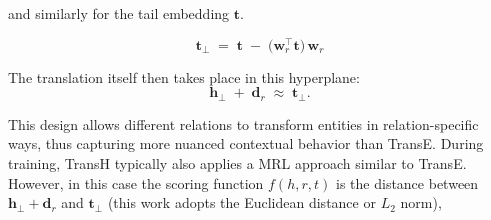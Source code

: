 \begin{enumerate}
and similarly for the tail embedding \(\mathbf{t}\).

\begin{equation}
\mathbf{t}_{\perp}
  \;=\;
  \mathbf{t}
  \;-\;
  \bigl(\mathbf{w}_r^\top \mathbf{t}\bigr)\,\mathbf{w}_r
\end{equation}


The translation itself then takes place in this hyperplane:
\begin{equation}
    \mathbf{h}_\perp \;+\; \mathbf{d}_r \;\approx\; \mathbf{t}_\perp.
\end{equation}
  
This design allows different relations to transform entities in relation-specific ways, thus capturing more nuanced contextual behavior than TransE. During training, TransH typically also applies a \ac{MRL} approach similar to TransE. However, in this case the scoring function \(f(h, r, t)\) is the distance between \(\mathbf{h}_\perp + \mathbf{d}_r\) and \(\mathbf{t}_\perp\) (this work adopts the Euclidean distance or \(L_2\) norm),


\end{enumerate}
